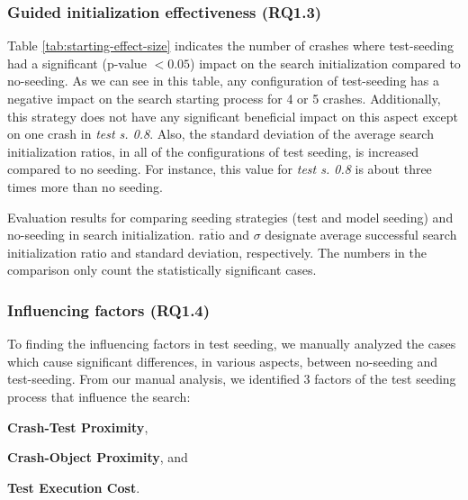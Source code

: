 \subsubsection{Guided initialization effectiveness (\textbf{RQ1.3})}

Table \ref{tab:starting-effect-size} indicates the number of crashes where test-seeding had a significant (p-value $< 0.05$) impact on the search initialization compared to no-seeding. As we can see in this table, any configuration of test-seeding has a negative impact on the search starting process for 4 or 5 crashes. Additionally, this strategy does not have any significant beneficial impact on this aspect except on one crash in \textit{test s. 0.8}. Also, the standard deviation of the average search initialization ratios, in all of the configurations of test seeding, is increased compared to no seeding. For instance, this value for \textit{test s. 0.8} is about three times more than no seeding.


\begin{table}[t]
	\center
	\caption{Evaluation results for comparing seeding strategies (test and model seeding) and no-seeding in search initialization. $\overline{\text{ratio}}$ and $\sigma$  designate average successful search initialization ratio and standard deviation, respectively. The numbers in the comparison only count the statistically significant cases.}
	\label{tab:starting-effect-size}
	\begin{footnotesize}
		\subfloat{}
		\subfloat{}
	\end{footnotesize}
\end{table}


\subsubsection{Influencing factors (\textbf{RQ1.4})}
\label{sec:eval:rq14}

To finding the influencing factors in test seeding, we manually analyzed the cases which cause significant differences, in various aspects, between no-seeding and test-seeding. From our manual analysis, we identified 3 factors of the test seeding process that influence the search:
%
\begin{inparaenum}[(i)]
\item \textbf{Crash-Test Proximity},
\item \textbf{Crash-Object Proximity}, and
\item \textbf{Test Execution Cost}.
\end{inparaenum}

